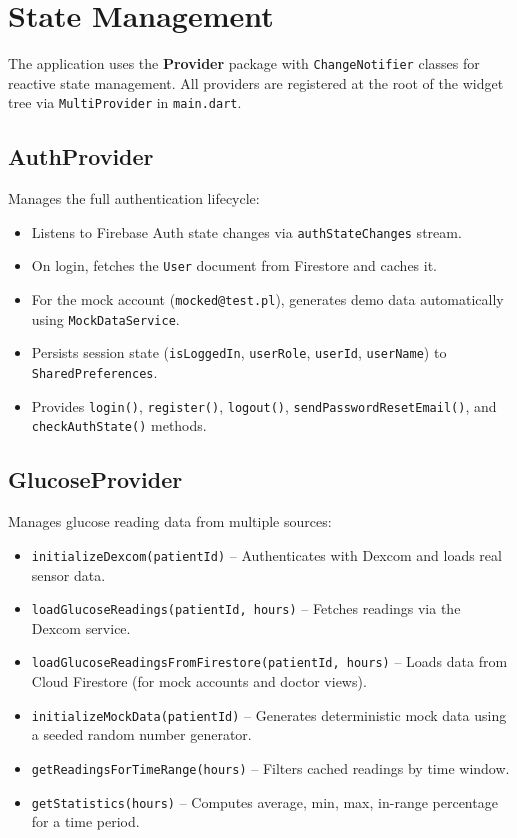 \documentclass[12pt,a4paper]{article}
\begin{document}
\section{State Management}

The application uses the \textbf{Provider} package with \texttt{ChangeNotifier} classes for reactive state management. All providers are registered at the root of the widget tree via \texttt{MultiProvider} in \texttt{main.dart}.

\subsection{AuthProvider}

Manages the full authentication lifecycle:
\begin{itemize}
    \item Listens to Firebase Auth state changes via \texttt{authStateChanges} stream.
    \item On login, fetches the \texttt{User} document from Firestore and caches it.
    \item For the mock account (\texttt{mocked@test.pl}), generates demo data automatically using \texttt{MockDataService}.
    \item Persists session state (\texttt{isLoggedIn}, \texttt{userRole}, \texttt{userId}, \texttt{userName}) to \texttt{SharedPreferences}.
    \item Provides \texttt{login()}, \texttt{register()}, \texttt{logout()}, \texttt{sendPasswordResetEmail()}, and \texttt{checkAuthState()} methods.
\end{itemize}

\subsection{GlucoseProvider}

Manages glucose reading data from multiple sources:
\begin{itemize}
    \item \texttt{initializeDexcom(patientId)} -- Authenticates with Dexcom and loads real sensor data.
    \item \texttt{loadGlucoseReadings(patientId, hours)} -- Fetches readings via the Dexcom service.
    \item \texttt{loadGlucoseReadingsFromFirestore(patientId, hours)} -- Loads data from Cloud Firestore (for mock accounts and doctor views).
    \item \texttt{initializeMockData(patientId)} -- Generates deterministic mock data using a seeded random number generator.
    \item \texttt{getReadingsForTimeRange(hours)} -- Filters cached readings by time window.
    \item \texttt{getStatistics(hours)} -- Computes average, min, max, in-range percentage for a time period.
\end{itemize}
\end{document}
